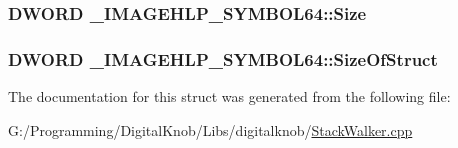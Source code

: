 \hypertarget{struct___i_m_a_g_e_h_l_p___s_y_m_b_o_l64_a2e161070e214274e315ee0461dd0b17b}{
\subsubsection[{Size}]{\setlength{\rightskip}{0pt plus 5cm}D\-W\-O\-R\-D \-\_\-\-I\-M\-A\-G\-E\-H\-L\-P\-\_\-\-S\-Y\-M\-B\-O\-L64\-::\-Size}}\label{struct___i_m_a_g_e_h_l_p___s_y_m_b_o_l64_a2e161070e214274e315ee0461dd0b17b}
\hypertarget{struct___i_m_a_g_e_h_l_p___s_y_m_b_o_l64_a8c1bc2605fd959caf0c66bb8514a2748}{
\subsubsection[{Size\-Of\-Struct}]{\setlength{\rightskip}{0pt plus 5cm}D\-W\-O\-R\-D \-\_\-\-I\-M\-A\-G\-E\-H\-L\-P\-\_\-\-S\-Y\-M\-B\-O\-L64\-::\-Size\-Of\-Struct}}\label{struct___i_m_a_g_e_h_l_p___s_y_m_b_o_l64_a8c1bc2605fd959caf0c66bb8514a2748}


The documentation for this struct was generated from the following file\-:\begin{DoxyCompactItemize}
\item 
G\-:/\-Programming/\-Digital\-Knob/\-Libs/digitalknob/\hyperlink{_stack_walker_8cpp}{Stack\-Walker.\-cpp}\end{DoxyCompactItemize}
